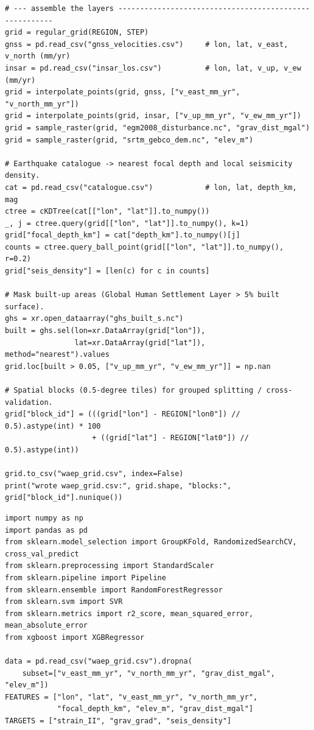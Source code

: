 \documentclass[pdflatex,sn-mathphys-num]{sn-jnl}%
\theoremstyle{thmstyleone}%
\theoremstyle{thmstyletwo}%
\theoremstyle{thmstylethree}%
\begin{document}
\begin{appendices}
\begin{lstlisting}
# --- assemble the layers -------------------------------------------------------
grid = regular_grid(REGION, STEP)
gnss = pd.read_csv("gnss_velocities.csv")     # lon, lat, v_east, v_north (mm/yr)
insar = pd.read_csv("insar_los.csv")          # lon, lat, v_up, v_ew (mm/yr)
grid = interpolate_points(grid, gnss, ["v_east_mm_yr", "v_north_mm_yr"])
grid = interpolate_points(grid, insar, ["v_up_mm_yr", "v_ew_mm_yr"])
grid = sample_raster(grid, "egm2008_disturbance.nc", "grav_dist_mgal")
grid = sample_raster(grid, "srtm_gebco_dem.nc", "elev_m")

# Earthquake catalogue -> nearest focal depth and local seismicity density.
cat = pd.read_csv("catalogue.csv")            # lon, lat, depth_km, mag
ctree = cKDTree(cat[["lon", "lat"]].to_numpy())
_, j = ctree.query(grid[["lon", "lat"]].to_numpy(), k=1)
grid["focal_depth_km"] = cat["depth_km"].to_numpy()[j]
counts = ctree.query_ball_point(grid[["lon", "lat"]].to_numpy(), r=0.2)
grid["seis_density"] = [len(c) for c in counts]

# Mask built-up areas (Global Human Settlement Layer > 5% built surface).
ghs = xr.open_dataarray("ghs_built_s.nc")
built = ghs.sel(lon=xr.DataArray(grid["lon"]),
                lat=xr.DataArray(grid["lat"]), method="nearest").values
grid.loc[built > 0.05, ["v_up_mm_yr", "v_ew_mm_yr"]] = np.nan

# Spatial blocks (0.5-degree tiles) for grouped splitting / cross-validation.
grid["block_id"] = (((grid["lon"] - REGION["lon0"]) // 0.5).astype(int) * 100
                    + ((grid["lat"] - REGION["lat0"]) // 0.5).astype(int))

grid.to_csv("waep_grid.csv", index=False)
print("wrote waep_grid.csv:", grid.shape, "blocks:", grid["block_id"].nunique())
\end{lstlisting}

\begin{lstlisting}[style=py,caption={Full hyper-parameter search and spatially grouped cross-validation, fitted independently for each target field with random-forest and support-vector baselines.},label={lst:tune}]
import numpy as np
import pandas as pd
from sklearn.model_selection import GroupKFold, RandomizedSearchCV, cross_val_predict
from sklearn.preprocessing import StandardScaler
from sklearn.pipeline import Pipeline
from sklearn.ensemble import RandomForestRegressor
from sklearn.svm import SVR
from sklearn.metrics import r2_score, mean_squared_error, mean_absolute_error
from xgboost import XGBRegressor

data = pd.read_csv("waep_grid.csv").dropna(
    subset=["v_east_mm_yr", "v_north_mm_yr", "grav_dist_mgal", "elev_m"])
FEATURES = ["lon", "lat", "v_east_mm_yr", "v_north_mm_yr",
            "focal_depth_km", "elev_m", "grav_dist_mgal"]
TARGETS = ["strain_II", "grav_grad", "seis_density"]


\end{lstlisting}
\end{appendices}
\end{document}
